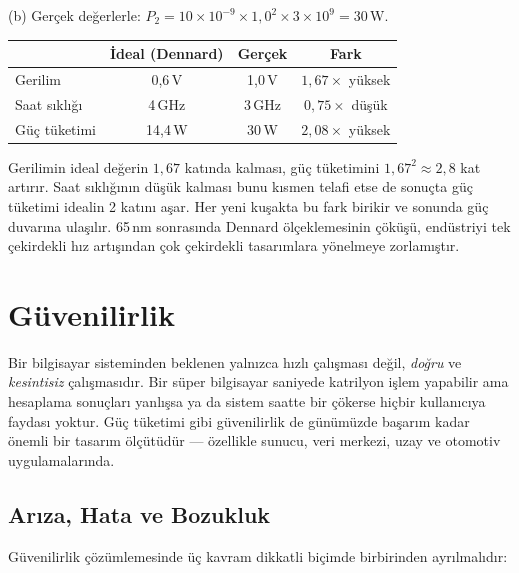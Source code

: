 \begin{ornek}[1.6]
(b) Gerçek değerlerle: $P_2 = 10 \times 10^{-9} \times 1{,}0^2 \times 3 \times 10^{9} = 30$\,W.

\begin{center}
\small
\begin{tabular}{lccc}
\toprule
& \textbf{İdeal (Dennard)} & \textbf{Gerçek} & \textbf{Fark} \\
\midrule
Gerilim & 0{,}6\,V & 1{,}0\,V & $1{,}67\times$ yüksek \\
Saat sıklığı & 4\,GHz & 3\,GHz & $0{,}75\times$ düşük \\
Güç tüketimi & 14{,}4\,W & 30\,W & $2{,}08\times$ yüksek \\
\bottomrule
\end{tabular}
\end{center}

Gerilimin ideal değerin $1{,}67$ katında kalması, güç tüketimini $1{,}67^2 \approx 2{,}8$ kat artırır. Saat sıklığının düşük kalması bunu kısmen telafi etse de sonuçta güç tüketimi idealin 2 katını aşar. Her yeni kuşakta bu fark birikir ve sonunda güç duvarına ulaşılır. 65\,nm sonrasında Dennard ölçeklemesinin çöküşü, endüstriyi tek çekirdekli hız artışından çok çekirdekli tasarımlara yönelmeye zorlamıştır.
\end{ornek}

\section{Güvenilirlik}
\label{sec:guvenilirlik}

Bir bilgisayar sisteminden beklenen yalnızca hızlı çalışması değil, \emph{doğru} ve \emph{kesintisiz} çalışmasıdır. Bir süper bilgisayar saniyede katrilyon işlem yapabilir ama hesaplama sonuçları yanlışsa ya da sistem saatte bir çökerse hiçbir kullanıcıya faydası yoktur. Güç tüketimi gibi güvenilirlik de günümüzde başarım kadar önemli bir tasarım ölçütüdür --- özellikle sunucu, veri merkezi, uzay ve otomotiv uygulamalarında.

\subsection{Arıza, Hata ve Bozukluk}
\label{subsec:ariza-hata-bozukluk}

Güvenilirlik çözümlemesinde üç kavram dikkatli biçimde birbirinden ayrılmalıdır:

